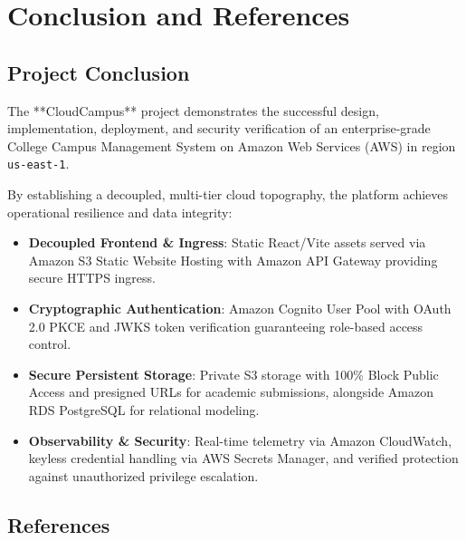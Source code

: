 \newpage
\section{Conclusion and References}

\subsection{Project Conclusion}
The **CloudCampus** project demonstrates the successful design, implementation, deployment, and security verification of an enterprise-grade College Campus Management System on Amazon Web Services (AWS) in region \texttt{us-east-1}.

By establishing a decoupled, multi-tier cloud topography, the platform achieves operational resilience and data integrity:
\begin{itemize}[leftmargin=*,itemsep=1pt]
    \item \textbf{Decoupled Frontend \& Ingress}: Static React/Vite assets served via Amazon S3 Static Website Hosting with Amazon API Gateway providing secure HTTPS ingress.
    \item \textbf{Cryptographic Authentication}: Amazon Cognito User Pool with OAuth 2.0 PKCE and JWKS token verification guaranteeing role-based access control.
    \item \textbf{Secure Persistent Storage}: Private S3 storage with 100\% Block Public Access and presigned URLs for academic submissions, alongside Amazon RDS PostgreSQL for relational modeling.
    \item \textbf{Observability \& Security}: Real-time telemetry via Amazon CloudWatch, keyless credential handling via AWS Secrets Manager, and verified protection against unauthorized privilege escalation.
\end{itemize}

\subsection{References}



